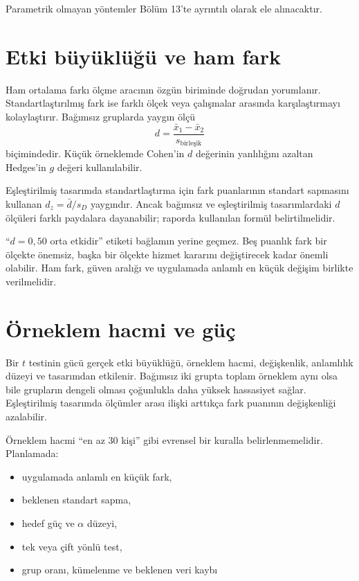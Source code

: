 Parametrik olmayan yöntemler Bölüm 13'te ayrıntılı olarak ele alınacaktır.

\section{Etki büyüklüğü ve ham fark}

Ham ortalama farkı ölçme aracının özgün biriminde doğrudan yorumlanır.
Standartlaştırılmış fark ise farklı ölçek veya çalışmalar arasında
karşılaştırmayı kolaylaştırır. Bağımsız gruplarda yaygın ölçü
\[
d=\frac{\bar x_1-\bar x_2}{s_{\text{birleşik}}}
\]
biçimindedir. Küçük örneklemde Cohen'in $d$ değerinin yanlılığını azaltan
Hedges'in $g$ değeri kullanılabilir.

Eşleştirilmiş tasarımda standartlaştırma için fark puanlarının standart
sapmasını kullanan $d_z=\bar d/s_D$ yaygındır. Ancak bağımsız ve eşleştirilmiş
tasarımlardaki $d$ ölçüleri farklı paydalara dayanabilir; raporda kullanılan
formül belirtilmelidir.

\begin{mistakebox}
``$d=0{,}50$ orta etkidir'' etiketi bağlamın yerine geçmez. Beş puanlık fark
bir ölçekte önemsiz, başka bir ölçekte hizmet kararını değiştirecek kadar
önemli olabilir. Ham fark, güven aralığı ve uygulamada anlamlı en küçük değişim
birlikte verilmelidir.
\end{mistakebox}

\section{Örneklem hacmi ve güç}

Bir $t$ testinin gücü gerçek etki büyüklüğü, örneklem hacmi, değişkenlik,
anlamlılık düzeyi ve tasarımdan etkilenir. Bağımsız iki grupta toplam örneklem
aynı olsa bile grupların dengeli olması çoğunlukla daha yüksek hassasiyet
sağlar. Eşleştirilmiş tasarımda ölçümler arası ilişki arttıkça fark puanının
değişkenliği azalabilir.

Örneklem hacmi ``en az 30 kişi'' gibi evrensel bir kuralla belirlenmemelidir.
Planlamada:

\begin{itemize}
  \item uygulamada anlamlı en küçük fark,
  \item beklenen standart sapma,
  \item hedef güç ve $\alpha$ düzeyi,
  \item tek veya çift yönlü test,
  \item grup oranı, kümelenme ve beklenen veri kaybı
\end{itemize}

